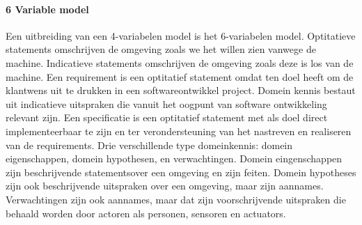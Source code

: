 \documentclass{article}
\begin{document}
	
	\paragraph{6 Variable model}
	Een uitbreiding van een 4-variabelen model is het 6-variabelen model.
	Optitatieve statements omschrijven de omgeving zoals we het willen zien vanwege de machine. 
	Indicatieve statements omschrijven de omgeving zoals deze is los van de machine. 
	Een requirement is een optitatief statement omdat ten doel heeft om de klantwens uit te drukken in een softwareontwikkel project. 
	Domein kennis bestaut uit indicatieve uitspraken die vanuit het oogpunt van software ontwikkeling relevant zijn. 
	Een specificatie is een optitatief statement met als doel direct implementeerbaar te zijn en ter verondersteuning van het nastreven en realiseren van de requirements. 
	Drie verschillende type domeinkennis: domein eigenschappen, domein hypothesen, en verwachtingen. 
	Domein eingenschappen  zijn beschrijvende statementsover een omgeving en zijn feiten. Domein hypotheses  zijn ook beschrijvende uitspraken over een omgeving, maar zijn aannames. 
	Verwachtingen zijn ook aannames, maar dat zijn voorschrijvende uitspraken die behaald worden door actoren als personen, sensoren en actuators. 
	
\end{document}

